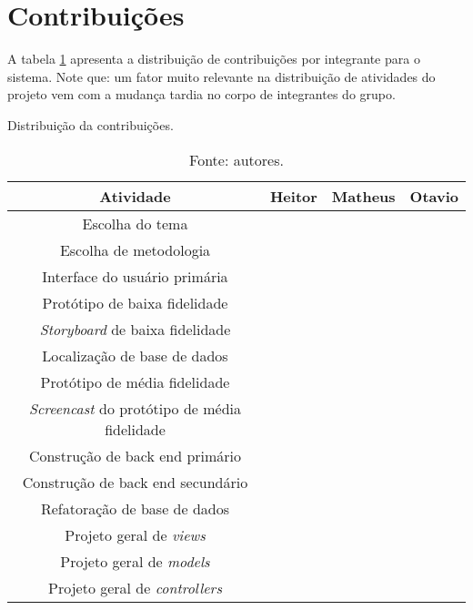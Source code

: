 \section{Contribuições}

A tabela \ref{tab:contribuicoes} apresenta a distribuição de contribuições por integrante para o sistema. Note que: um fator muito relevante na distribuição de atividades do projeto vem com a mudança tardia no corpo de integrantes do grupo.

\begin{table}[h]
	\centering
	\caption{Distribuição da contribuições.}
	\label{tab:contribuicoes}
	\begin{tabular}{cccc}
		\toprule
	Atividade 				           						& Heitor & Matheus & Otavio \\ \midrule
		Escolha do tema                    					& \x     & \g      & \x     \\ \cmidrule{1-1}
		Escolha de metodologia             					& \g     & \g      & \x     \\ \cmidrule{1-1}
		Interface do usuário primária                       & \x  	 & \g 	   & \g     \\ \cmidrule{1-1}
		Protótipo de baixa fidelidade 						& \x  	 & \g      & \g     \\ \cmidrule{1-1}
		\emph{Storyboard} de baixa fidelidade 				& \x  	 & \g      & \g     \\ \cmidrule{1-1}
		Localização de base de dados     					& \g  	 & \x      & \g     \\ \cmidrule{1-1}
		Protótipo de média fidelidade 						& \x  	 & \g      & \g     \\ \cmidrule{1-1}
		\emph{Screencast} do protótipo de média fidelidade 	& \x  	 & \g      & \g     \\ \cmidrule{1-1}
		Construção de back end primário 					& \x  	 & \g      & \x     \\ \cmidrule{1-1}
		Construção de back end secundário 					& \g  	 & \g      & \x     \\ \cmidrule{1-1}
		Refatoração de base de dados     					& \x  	 & \g      & \g     \\ \cmidrule{1-1}
		Projeto geral de \emph{views}          				& \x  	 & \g      & \g     \\ \cmidrule{1-1}
		Projeto geral de \emph{models}          			& \x  	 & \g      & \x     \\ \cmidrule{1-1}
		Projeto geral de \emph{controllers}          		& \x  	 & \g      & \x     \\ \bottomrule
	\end{tabular}
	\vspace{1em}
	\caption*{Fonte: autores.}\end{table}